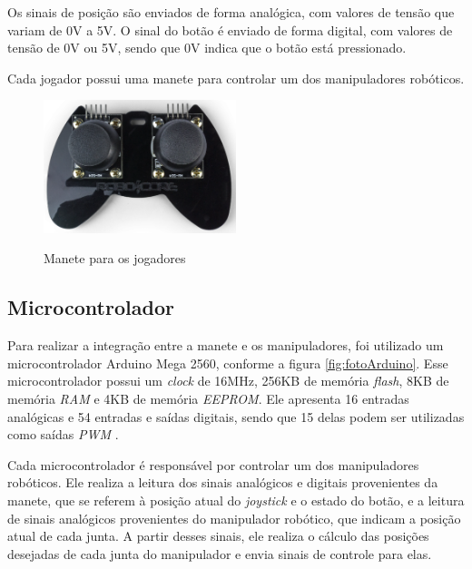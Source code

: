 Os sinais de posição são enviados de forma analógica, com valores de tensão que variam de 0V a 5V.
O sinal do botão é enviado de forma digital, com valores de tensão de 0V ou 5V, sendo que 0V indica que o botão está pressionado.

Cada jogador possui uma manete para controlar um dos manipuladores robóticos.

\begin{figure}[H]
    \centering
    \caption{Manete para os jogadores}
    \includegraphics[keepaspectratio=true, width=0.5\textwidth]
    	{img/foto-controle-jogadores.png}
    \label{fig:fotoManeteJogadores}
\end{figure}

\subsection[Microcontrolador]{Microcontrolador}
\label{sub:microcontrolador}

Para realizar a integração entre a manete e os manipuladores, foi utilizado um microcontrolador Arduino Mega 2560, conforme a figura \ref{fig:fotoArduino}.
Esse microcontrolador possui um \textit{clock} de 16MHz, 256KB de memória \textit{flash}, 8KB de memória \textit{RAM} e 4KB de memória \textit{EEPROM}.
Ele apresenta 16 entradas analógicas e 54 entradas e saídas digitais, sendo que 15 delas podem ser utilizadas como saídas \textit{PWM}  \cite{arduino_mega_2560_datasheet}.

Cada microcontrolador é responsável por controlar um dos manipuladores robóticos.
Ele realiza a leitura dos sinais analógicos e digitais provenientes da manete, que se referem à posição atual do \textit{joystick} e o estado do botão, e a leitura de sinais analógicos provenientes do manipulador robótico, que indicam a posição atual de cada junta.
A partir desses sinais, ele realiza o cálculo das posições desejadas de cada junta do manipulador e envia sinais de controle para elas.

